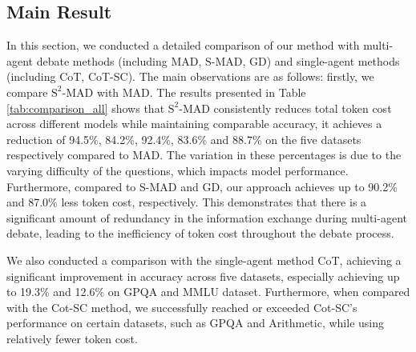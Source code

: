 \subsection{Main Result} 
In this section, we conducted a detailed comparison of our method with multi-agent debate methods (including MAD, S-MAD, GD) and single-agent methods (including CoT, CoT-SC). The main observations are as follows:
firstly, we compare \({\text{S}^2\text{-MAD}}\) with MAD. The results presented in Table \ref{tab:comparison_all} shows that \({\text{S}^2\text{-MAD}}\) consistently reduces total token cost across different models while maintaining comparable accuracy, it achieves a reduction of 94.5\%, 84.2\%, 92.4\%, 83.6\% and 88.7\% on the five datasets respectively compared to MAD. The variation in these percentages is due to the varying difficulty of the questions, which impacts model performance. Furthermore, compared to S-MAD and GD, our approach achieves up to 90.2\% and 87.0\% less token cost, respectively. This demonstrates that there is a significant amount of redundancy in the information exchange during multi-agent debate, leading to the inefficiency of token cost throughout the debate process.

We also conducted a comparison with the single-agent method CoT, achieving a significant improvement in accuracy across five datasets, especially achieving up to 19.3\% and 12.6\% on GPQA and MMLU dataset. Furthermore, when compared with the Cot-SC method, we successfully reached or exceeded Cot-SC's performance on certain datasets, such as GPQA and Arithmetic, while using relatively fewer token cost. %

